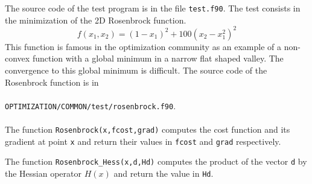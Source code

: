 \documentclass[a4paper,twoside,final,onecolumn,11pt,openright]{article}
\begin{document}
\vspace{0.5cm}

The source code of the test program is in the file \texttt{test.f90}. The test consists in the minimization of the 2D Rosenbrock function. 
\begin{equation}
 f(x_1,x_2)  = (1-x_1)^2+100(x_2-x_1^2)^2
\end{equation}
This function is famous in the optimization community as an example of a non-convex function with a global minimum in a narrow flat shaped valley. The convergence to this global minimum is difficult. The source code of the Rosenbrock function is in
\\
\\
\texttt{OPTIMIZATION/COMMON/test/rosenbrock.f90}. 
\\
\\
The function \texttt{Rosenbrock(x,fcost,grad)} computes the cost function and its gradient at point \texttt{x} and return their values in \texttt{fcost} and \texttt{grad} respectively. 

The function \texttt{Rosenbrock\_Hess(x,d,Hd)} computes the product of the vector \texttt{d} by the Hessian operator $H(x)$ and return the value in \texttt{Hd}. \\

\vspace{0.5cm}
\end{document}
